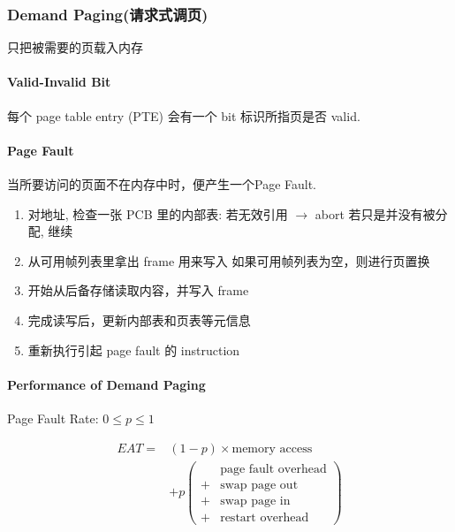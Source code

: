 \subsubsection{Demand Paging(请求式调页)}
只把被需要的页载入内存

\paragraph{Valid-Invalid Bit}每个 page table entry (PTE) 会有一个 bit 标识所指页是否 valid. 

\paragraph{Page Fault}当所要访问的页面不在内存中时，便产生一个Page Fault. 
\begin{enumerate}
    \item 对地址, 检查一张 PCB 里的内部表:
    \subitem 若无效引用 $\to$ abort
    \subitem 若只是并没有被分配, 继续
    \item 从可用帧列表里拿出 frame 用来写入
    \subitem 如果可用帧列表为空，则进行页置换
    \item 开始从后备存储读取内容，并写入 frame
    \item 完成读写后，更新内部表和页表等元信息
    \item 重新执行引起 page fault 的 instruction
\end{enumerate}



\paragraph{Performance of Demand Paging}Page Fault Rate: $0\le p \le 1$

\begin{align*}
    EAT =& (1-p)\times \text{memory access}\\
        & + p \left( \begin{array}{rl}
              &\text{page fault overhead}\\
            + &\text{swap page out}\\
            + &\text{swap page in}\\
            + &\text{restart overhead}
        \end{array} \right)
\end{align*}
